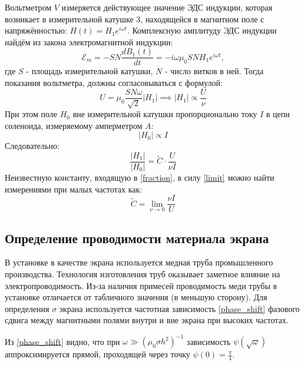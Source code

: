 \documentclass[15pt,a5paper,reqno]{article}
\begin{document}
        Вольтметром $V$ измеряется действующее значение ЭДС индукции, которая возникает в измерительной катушке 3, находящейся в магнитном поле с напряжённостью: $H(t) = H_1e^{i\omega t}$. Комплексную амплитуду ЭДС индукции найдём из закона электромагнитной индукции:
        \begin{equation*}
            \mathcal{E}_m = -SN\frac{dB_1(t)}{dt} = -i\omega\mu_0SNH_1e^{i\omega t},
        \end{equation*}
        где $S$ - площадь измерительной катушки, $N$ - число витков в ней. Тогда показания вольтметра, должны согласовываться с формулой:
        \begin{equation*}
            U = \mu_0\frac{SN\omega}{\sqrt{2}}|H_1| \implies |H_1| \propto \frac{U}{\nu}
        \end{equation*}
        При этом поле $H_0$ вне измерительной катушки пропорционально току $I$ в цепи соленоида, измеряемому амперметром $A$:
        \begin{equation*}
            |H_0| \propto I
        \end{equation*}
        Следовательно:
        \begin{equation}\label{fraction}
            \frac{|H_1|}{|H_0|} = \widetilde C \cdot \frac{U}{\nu I}
        \end{equation}
        Неизвестную константу, входящую в \eqref{fraction}, в силу \eqref{limit} можно найти измерениями при малых частотах как:
        \begin{equation*}
            \widetilde C = \lim\limits_{\nu \rightarrow 0} \frac{\nu I}{U}
        \end{equation*}

    \subsection{Определение проводимости материала экрана}
        В установке в качестве экрана используется медная труба промышленного производства. Технология изготовления труб оказывает заметное влияние на электропроводимость. Из-за наличия примесей проводимость меди трубы в установке отличается от табличного значения (в меньшую сторону). Для определения $\sigma$ экрана используется частотная зависимость \eqref{phase_shift} фазового сдвига между магнитными полями внутри и вне экрана при высоких частотах. 

        Из \eqref{phase_shift} видно, что при $\omega \gg (\mu_0 \sigma h^2)^{-1}$ зависимость $\psi(\sqrt{\omega})$ аппроксимируется прямой, проходящей через точку $\psi(0) = \frac{\pi}{4}$.
    
\end{document}
